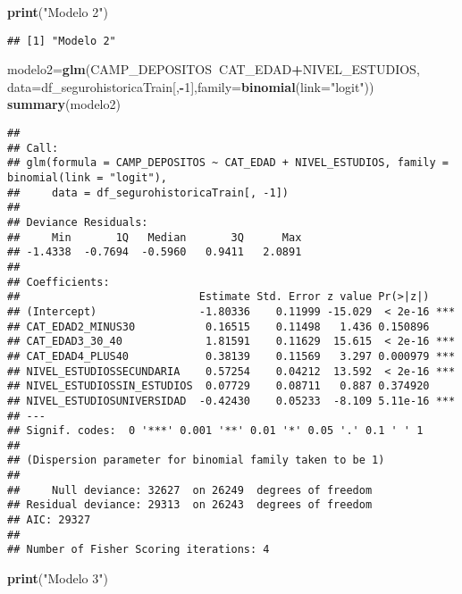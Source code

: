 \documentclass[]{article}
\newenvironment{Shaded}{\begin{snugshade}}{\end{snugshade}}
\newcommand{\KeywordTok}[1]{\textcolor[rgb]{0.13,0.29,0.53}{\textbf{#1}}}
\newcommand{\DataTypeTok}[1]{\textcolor[rgb]{0.13,0.29,0.53}{#1}}
\newcommand{\DecValTok}[1]{\textcolor[rgb]{0.00,0.00,0.81}{#1}}
\newcommand{\StringTok}[1]{\textcolor[rgb]{0.31,0.60,0.02}{#1}}
\newcommand{\OperatorTok}[1]{\textcolor[rgb]{0.81,0.36,0.00}{\textbf{#1}}}
\newcommand{\NormalTok}[1]{#1}
\begin{document}
\begin{Shaded}
\begin{Highlighting}[]
\KeywordTok{print}\NormalTok{(}\StringTok{"Modelo 2"}\NormalTok{)}
\end{Highlighting}
\end{Shaded}

\begin{verbatim}
## [1] "Modelo 2"
\end{verbatim}

\begin{Shaded}
\begin{Highlighting}[]
\NormalTok{modelo2=}\KeywordTok{glm}\NormalTok{(CAMP_DEPOSITOS}\OperatorTok{~}\NormalTok{CAT_EDAD}\OperatorTok{+}\NormalTok{NIVEL_ESTUDIOS, }\DataTypeTok{data=}\NormalTok{df_segurohistoricaTrain[,}\OperatorTok{-}\DecValTok{1}\NormalTok{],}\DataTypeTok{family=}\KeywordTok{binomial}\NormalTok{(}\DataTypeTok{link=}\StringTok{"logit"}\NormalTok{))}
\KeywordTok{summary}\NormalTok{(modelo2)}
\end{Highlighting}
\end{Shaded}

\begin{verbatim}
## 
## Call:
## glm(formula = CAMP_DEPOSITOS ~ CAT_EDAD + NIVEL_ESTUDIOS, family = binomial(link = "logit"), 
##     data = df_segurohistoricaTrain[, -1])
## 
## Deviance Residuals: 
##     Min       1Q   Median       3Q      Max  
## -1.4338  -0.7694  -0.5960   0.9411   2.0891  
## 
## Coefficients:
##                            Estimate Std. Error z value Pr(>|z|)    
## (Intercept)                -1.80336    0.11999 -15.029  < 2e-16 ***
## CAT_EDAD2_MINUS30           0.16515    0.11498   1.436 0.150896    
## CAT_EDAD3_30_40             1.81591    0.11629  15.615  < 2e-16 ***
## CAT_EDAD4_PLUS40            0.38139    0.11569   3.297 0.000979 ***
## NIVEL_ESTUDIOSSECUNDARIA    0.57254    0.04212  13.592  < 2e-16 ***
## NIVEL_ESTUDIOSSIN_ESTUDIOS  0.07729    0.08711   0.887 0.374920    
## NIVEL_ESTUDIOSUNIVERSIDAD  -0.42430    0.05233  -8.109 5.11e-16 ***
## ---
## Signif. codes:  0 '***' 0.001 '**' 0.01 '*' 0.05 '.' 0.1 ' ' 1
## 
## (Dispersion parameter for binomial family taken to be 1)
## 
##     Null deviance: 32627  on 26249  degrees of freedom
## Residual deviance: 29313  on 26243  degrees of freedom
## AIC: 29327
## 
## Number of Fisher Scoring iterations: 4
\end{verbatim}

\begin{Shaded}
\begin{Highlighting}[]
\KeywordTok{print}\NormalTok{(}\StringTok{"Modelo 3"}\NormalTok{)}
\end{Highlighting}
\end{Shaded}
\end{document}
